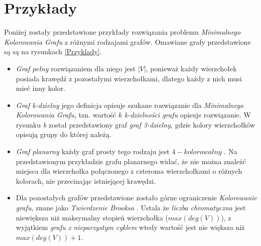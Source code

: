 \section{Przykłady}
Poniżej zostały przedstawione przykłady rozwiązania problemu \textit{Minimalnego Kolorowania Grafu} z
 różnymi rodzajami grafów. Omawiane grafy przedstawione są są na rysunkach \ref{Przyklady}.
\begin{itemize}
    \item \textit{Graf pełny} rozwiązaniem dla niego jest $|V|$, ponieważ każdy wierzchołek posiada krawędź z
     pozostałymi wierzchołkami, dlatego każdy z nich musi mieć inny kolor.
    \item \textit{Graf k-dzielny} jego definicja opisuje szukane rozwiązanie dla \textit{Minimalnego Kolorowania Grafu}, tzn. wartość $k$  \textit{k-dzielności grafu} opisuje rozwiązanie. W rysunku \textit{b} został przedstawiony graf \textit{graf 3-dzielny}, gdzie kolory wierzchołków opisują grupy do której należą.
    \item \textit{Graf planarny} każdy graf prosty tego rodzaju jest $4-kolorowalny$ \cite{4colorable}. Na przedstawionym przykładzie grafu planarnego widać, że nie można znaleźć miejsca dla wierzchołka połączonego z czteroma wierzchołkami o różnych kolorach, nie przecinając istniejącej krawędzi.
    \item Dla pozostałych grafów przedstawione zostało górne ograniczenie \textit{Kolorowanie grafu}, znane jako \textit{Twierdzenie Brooksa} \cite{brooks_1941}. 
    Ustala że \textit{liczba chromatyczna} jest niewiększa niż maksymalny stopień wierzchołka ($max(deg(V))$), z wyjątkiem
     \textit{grafu z nieparzystym cyklem} wtedy wartość jest nie większa niż $max(deg(V)) + 1$.
\end{itemize}

